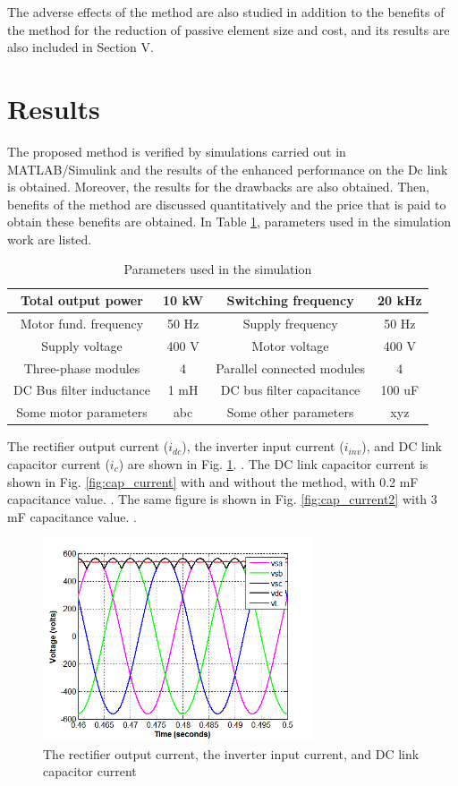 \documentclass[conference,a4paper,twocolumn]{IEEEtran}
\begin{document}
The adverse effects of the method are also studied in addition to the benefits of the method for the reduction of passive element size and cost, and its results are also included in Section V.

\section{Results}
The proposed method is verified by simulations carried out in MATLAB/Simulink and the results of the enhanced performance on the Dc link is obtained. Moreover, the results for the drawbacks are also obtained. Then, benefits of the method are discussed quantitatively and the price that is paid to obtain these benefits are obtained. In Table \ref{table:sim_param}, parameters used in the simulation work are listed.

\begin{table}[h]
\renewcommand{\arraystretch}{1.4}
\caption{Parameters used in the simulation}
\label{table:sim_param}
\centering
\begin{tabular}{|c|c|c|c|}
\hline
Total output power & 10 kW & Switching frequency & 20 kHz\\
\hline
Motor fund. frequency & 50 Hz & Supply frequency & 50 Hz\\
\hline
Supply voltage & 400 V & Motor voltage & 400 V\\
\hline
Three-phase modules & 4 & Parallel connected modules & 4\\
\hline
DC Bus filter inductance & 1 mH & DC bus filter capacitance & 100 uF\\
\hline
Some motor parameters & abc & Some other parameters & xyz\\
\hline
\end{tabular}
\end{table}

The rectifier output current ($i_{dc}$), the inverter input current ($i_{inv}$), and DC link capacitor current ($i_{c}$) are shown in Fig. \ref{fig:main_currents}. . The DC link capacitor current is shown in Fig. \ref{fig:cap_current} with and without the method, with 0.2 mF capacitance value. . The same figure is shown in Fig. \ref{fig:cap_current2} with 3 mF capacitance value. .

\begin{figure}[h]
  \centering
  \includegraphics[width=8cm]{images/sample}
  \caption{The rectifier output current, the inverter input current, and DC link capacitor current}
  \label{fig:main_currents}
\end{figure}
\end{document}
